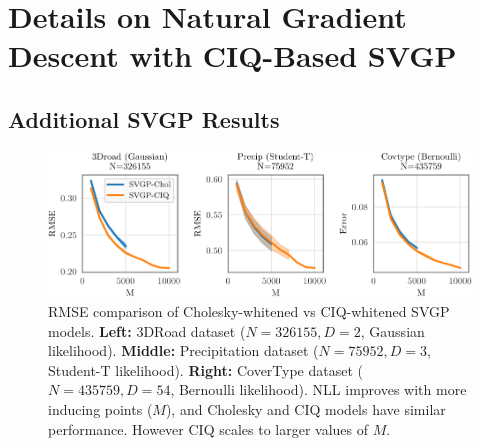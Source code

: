 \chapter{Details on Natural Gradient Descent with CIQ-Based SVGP}
\label{app:ngd}

\section{Additional SVGP Results}

\begin{figure}[ht!]
  \centering
  \includegraphics[width=\linewidth]{figures/variational_error.pdf}
  \caption[RMSE comparison of Cholesky-whitened vs CIQ-whitened SVGP models.]{
    RMSE comparison of Cholesky-whitened vs CIQ-whitened SVGP models.
    {\bf Left:} 3DRoad dataset ($N=326155, D=2$, Gaussian likelihood).
    {\bf Middle:} Precipitation dataset ($N=75952, D=3$, Student-T likelihood).
    {\bf Right:} CoverType dataset ($N=435759, D=54$, Bernoulli likelihood).
    NLL improves with more inducing points ($M$), and Cholesky and CIQ models have similar performance.
    However CIQ scales to larger values of $M$.
  }
  \label{fig:variational_error}
\end{figure}

